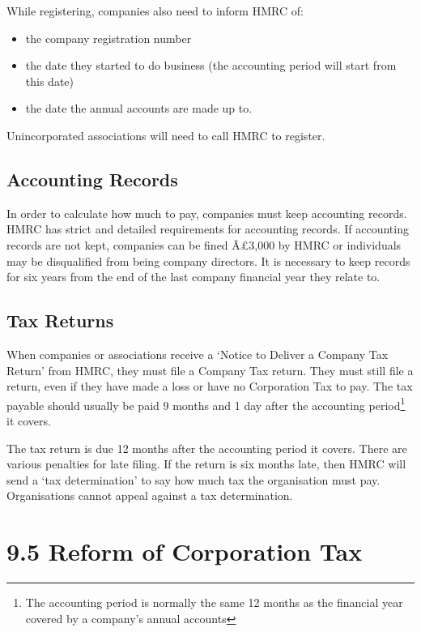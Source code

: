 \documentclass[]{tufte-handout}
\providecommand{\tightlist}{%
  \setlength{\itemsep}{0pt}\setlength{\parskip}{0pt}}
\begin{document}
While registering, companies also need to inform HMRC of:

\begin{itemize}
\tightlist
\item
  the company registration number
\item
  the date they started to do business (the accounting period will start
  from this date)
\item
  the date the annual accounts are made up to.
\end{itemize}

Unincorporated associations will need to call HMRC to register.

\hypertarget{accounting-records}{%
\subsection{Accounting Records}\label{accounting-records}}

In order to calculate how much to pay, companies must keep accounting
records. HMRC has strict and detailed requirements for accounting
records. If accounting records are not kept, companies can be fined
Â£3,000 by HMRC or individuals may be disqualified from being company
directors. It is necessary to keep records for six years from the end of
the last company financial year they relate to.

\hypertarget{tax-returns}{%
\subsection{Tax Returns}\label{tax-returns}}

When companies or associations receive a `Notice to Deliver a Company
Tax Return' from HMRC, they must file a Company Tax return. They must
still file a return, even if they have made a loss or have no
Corporation Tax to pay. The tax payable should usually be paid 9 months
and 1 day after the accounting period\footnote{The accounting period is
  normally the same 12 months as the financial year covered by a
  company's annual accounts} it covers.

The tax return is due 12 months after the accounting period it covers.
There are various penalties for late filing. If the return is six months
late, then HMRC will send a `tax determination' to say how much tax the
organisation must pay. Organisations cannot appeal against a tax
determination.

\hypertarget{reform-of-corporation-tax}{%
\section{9.5 Reform of Corporation
Tax}\label{reform-of-corporation-tax}}
\end{document}
